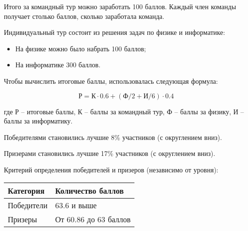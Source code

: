 Итого за командный тур можно заработать 100 баллов. Каждый член команды получает столько баллов, сколько заработала команда.
 
Индивидуальный тур состоит из решения задач по физике и информатике:
\begin{itemize}
    \item На физике можно было набрать 100 баллов;
    \item На информатике 300 баллов.
\end{itemize}
 
Чтобы вычислить итоговые баллы, использовалась следующая формула:
 
$$\text{Р} = \text{К} \cdot 0.6 + (\text{Ф}/2+\text{И}/6) \cdot 0.4$$

где Р – итоговые баллы, К – баллы за командный тур, Ф – баллы за физику, И – баллы за информатику.
 
Победителями становились лучшие 8\% участников (с округлением вниз).

Призерами становились лучшие 17\% участников (с округлением вниз).

Критерий определения победителей и призеров (независимо от уровня):
\begin{center}
    \begin{tabular}{|l|l|}
        \hline
        Категория&Количество баллов\\
        \hline
        Победители&63.6 и выше\\
        \hline
        Призеры&От 60.86 до 63 баллов\\
        \hline
    \end{tabular}
\end{center}
